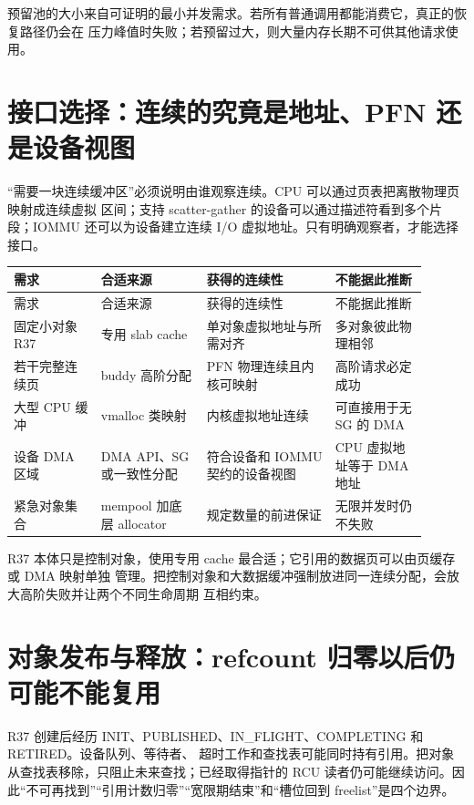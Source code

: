 预留池的大小来自可证明的最小并发需求。若所有普通调用都能消费它，真正的恢复路径仍会在
压力峰值时失败；若预留过大，则大量内存长期不可供其他请求使用。

\section{接口选择：连续的究竟是地址、PFN 还是设备视图}

“需要一块连续缓冲区”必须说明由谁观察连续。CPU 可以通过页表把离散物理页映射成连续虚拟
区间；支持 scatter-gather 的设备可以通过描述符看到多个片段；IOMMU 还可以为设备建立连续
I/O 虚拟地址。只有明确观察者，才能选择接口。

\begin{longtable}{|L{0.19\linewidth}|L{0.23\linewidth}|L{0.28\linewidth}|L{0.2\linewidth}|}
\hline
需求 & 合适来源 & 获得的连续性 & 不能据此推断 \\ \hline
\endfirsthead
\hline
需求 & 合适来源 & 获得的连续性 & 不能据此推断 \\ \hline
\endhead
固定小对象 R37 & 专用 slab cache & 单对象虚拟地址与所需对齐 & 多对象彼此物理相邻 \\\tablerowrule
若干完整连续页 & buddy 高阶分配 & PFN 物理连续且内核可映射 & 高阶请求必定成功 \\\tablerowrule
大型 CPU 缓冲 & vmalloc 类映射 & 内核虚拟地址连续 & 可直接用于无 SG 的 DMA \\\tablerowrule
设备 DMA 区域 & DMA API、SG 或一致性分配 & 符合设备和 IOMMU 契约的设备视图 & CPU 虚拟地址等于 DMA 地址 \\\tablerowrule
紧急对象集合 & mempool 加底层 allocator & 规定数量的前进保证 & 无限并发时仍不失败 \\
\hline
\end{longtable}

R37 本体只是控制对象，使用专用 cache 最合适；它引用的数据页可以由页缓存或 DMA 映射单独
管理。把控制对象和大数据缓冲强制放进同一连续分配，会放大高阶失败并让两个不同生命周期
互相约束。

\section{对象发布与释放：refcount 归零以后仍可能不能复用}

R37 创建后经历 INIT、PUBLISHED、IN\_FLIGHT、COMPLETING 和 RETIRED。设备队列、等待者、
超时工作和查找表可能同时持有引用。把对象从查找表移除，只阻止未来查找；已经取得指针的
RCU 读者仍可能继续访问。因此“不可再找到”“引用计数归零”“宽限期结束”和“槽位回到
freelist”是四个边界。

